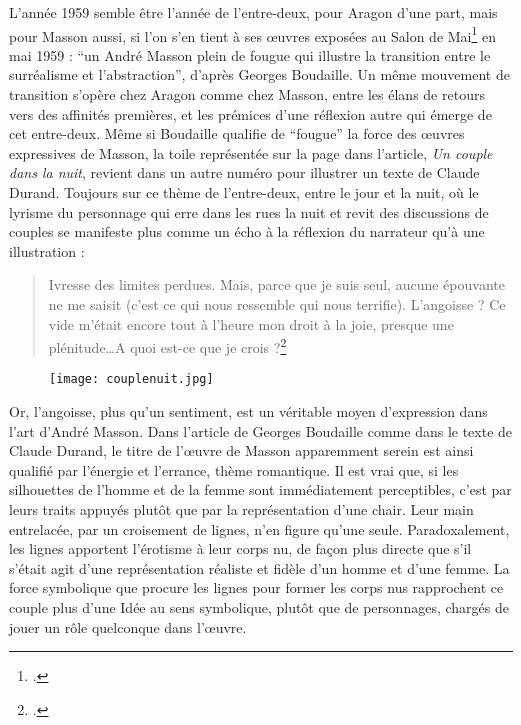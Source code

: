 L’année 1959 semble être l’année de l’entre-deux, pour Aragon d’une part, mais pour Masson aussi, si l’on s’en tient à ses \oe{}uvres exposées au Salon de Mai\footcite{salondemai} en mai 1959 : \enquote{un André Masson plein de fougue qui illustre la transition entre le surréalisme et l’abstraction}, d’après Georges Boudaille. Un même mouvement de transition s’opère chez Aragon comme chez Masson, entre les élans de retours vers des affinités premières, et les prémices d’une réflexion autre qui émerge de cet entre-deux. Même si Boudaille qualifie de \enquote{fougue} la force des \oe{}uvres expressives de Masson, la toile représentée sur la page dans l’article, \emph{Un couple dans la nuit}, revient dans un autre numéro pour illustrer un texte de Claude Durand. Toujours sur ce thème de l’entre-deux, entre le jour et la nuit, où le lyrisme du personnage qui erre dans les rues la nuit et revit des discussions de couples se manifeste plus comme un écho à la réflexion du narrateur qu’à une illustration : 


\begin{quote}
Ivresse des limites perdues. Mais, parce que je suis seul, aucune épouvante ne me saisit (c’est ce qui nous ressemble qui nous terrifie). L’angoisse ? Ce vide m’était encore tout à l’heure mon droit à la joie, presque une plénitude…A quoi est-ce que je crois ?\footcite{durand} 	
\end{quote}


\begin{figure}[H]
   \centering
   \texttt{[image: couplenuit.jpg]}
	\caption{\cite{durand}}\label{fig:Un couple dans la nuit}
\end{figure}


 Or, l’angoisse, plus qu’un sentiment, est un véritable moyen d’expression dans l’art d’André Masson. Dans l’article de Georges Boudaille comme dans le texte de Claude Durand, le titre de l’\oe{}uvre de Masson apparemment serein est ainsi qualifié par l’énergie et l’errance, thème romantique. Il est vrai que, si les silhouettes de l’homme et de la femme sont immédiatement perceptibles, c’est par leurs traits appuyés plutôt que par la représentation d’une chair. Leur main entrelacée, par un croisement de lignes, n’en figure qu’une seule. Paradoxalement, les lignes apportent l’érotisme à leur corps nu, de façon plus directe que s’il s’était agit d’une représentation réaliste et fidèle d’un homme et d’une femme. La force symbolique que procure les lignes pour former les corps nus rapprochent ce couple plus d’une Idée au sens symbolique, plutôt que de personnages, chargés de jouer un rôle quelconque dans l’\oe{}uvre.  


